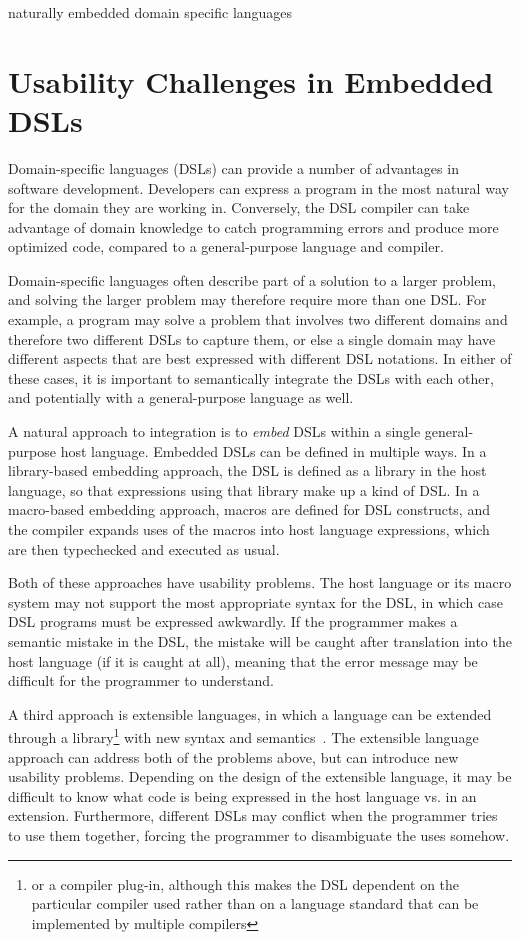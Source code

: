 \documentclass{sigplanconf}
\begin{document}
\keywords
naturally embedded domain specific languages

\section{Usability Challenges in Embedded DSLs}

Domain-specific languages (DSLs) can provide a number of advantages in
software development. Developers can express a program in the most
natural way for the domain they are working in.  Conversely, the DSL
compiler can take advantage of domain knowledge to catch programming
errors and produce more optimized code, compared to a general-purpose
language and compiler.

Domain-specific languages often describe part of a solution to a
larger problem, and solving the larger problem may therefore require
more than one DSL.  For example, a program may solve a problem that
involves two different domains and therefore two different DSLs to
capture them, or else a single domain may have different aspects that
are best expressed with different DSL notations.  In either of these
cases, it is important to semantically integrate the DSLs with each
other, and potentially with a general-purpose language as well.

A natural approach to integration is to \textit{embed} DSLs within a
single general-purpose host language.
Embedded DSLs can be defined in multiple ways.  In a
library-based embedding approach, the DSL is defined as a library in
the host language, so that expressions using that library make up a
kind of DSL.  In a macro-based embedding approach, macros are defined
for DSL constructs, and the compiler expands uses of the macros into
host language expressions, which are then typechecked and executed
as usual.

Both of these approaches have usability problems.  The host language
or its macro system may not support the most appropriate syntax for
the DSL, in which case DSL programs must be expressed awkwardly.
If the programmer makes a semantic mistake in the DSL, the mistake
will be caught after translation into the host language (if it is
caught at all), meaning that the error message may be difficult for
the programmer to understand.

A third approach is extensible languages, in which a language
can be extended through a library\footnote{or a compiler plug-in,
although this makes the DSL dependent on the particular compiler
used rather than on a language standard that can be implemented
by multiple compilers} with new syntax and semantics~\cite{Erdweg:2011:SLL:2048147.2048199}.  The
extensible language approach can address both of the problems above,
but can introduce new usability problems.  Depending on the
design of the extensible language, it may be difficult to know
what code is being expressed in the host language vs. in an
extension.  Furthermore, different DSLs may conflict when the
programmer tries to use them together, forcing the programmer
to disambiguate the uses somehow.
\end{document}
